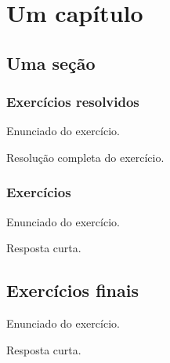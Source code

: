 
\chapter{Um capítulo}\label{cap:um_capitulo}

\emconstrucao

\section{Uma seção}\label{sec:uma_secao}

\construirSec

\subsection*{Exercícios resolvidos}

\construirExeresol

\begin{exeresol}
  Enunciado do exercício.
\end{exeresol}
\begin{resol}
  Resolução completa do exercício.
\end{resol}

\subsection*{Exercícios}

\construirExer

\begin{exer}
  Enunciado do exercício.
\end{exer}
\begin{resp}
  Resposta curta.
\end{resp}

\section{Exercícios finais}

\construirExer

\begin{exer}
  Enunciado do exercício.
\end{exer}
\begin{resp}
  Resposta curta.
\end{resp}

